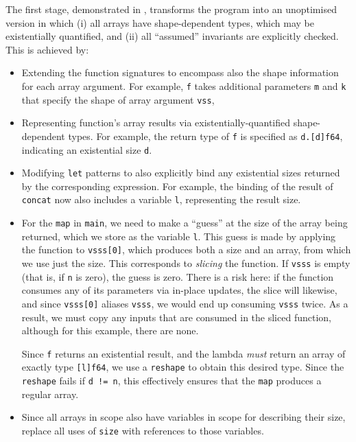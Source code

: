 The first stage, demonstrated in , transforms
the program into an unoptimised version in which (i) all arrays have
shape-dependent types, which may be existentially quantified, and (ii)
all ``assumed'' invariants are explicitly checked.
%
This is achieved by:
\begin{itemize}
\item Extending the function signatures to encompass also the shape
  information for each array argument.  For example, \lstinline{f}
  takes additional parameters \lstinline{m} and \lstinline{k} that
  specify the shape of array argument \lstinline{vss},

\item Representing function's array results via
  existentially-quantified shape-dependent types.  For example, the
  return type of \lstinline{f} is specified as
  \lstinline{d.[d]f64}, indicating an existential size \lstinline{d}.

\item Modifying \lstinline{let} patterns to also explicitly bind any
  existential sizes returned by the corresponding expression.  For
  example, the binding of the result of \lstinline{concat} now also
  includes a variable \lstinline{l}, representing the result size.

\item For the \lstinline{map} in \lstinline{main}, we need to make a
  ``guess'' at the size of the array being returned, which we store as
  the variable \lstinline{l}.  This guess is made by applying the
   function to \lstinline{vsss[0]}, which produces both a size
  and an array, from which we use just the size.  This corresponds to
  \textit{slicing} the  function.  If \lstinline{vsss} is
  empty (that is, if \lstinline{n} is zero), the guess is zero.  There
  is a risk here: if the  function consumes any of its
  parameters via in-place updates, the slice will likewise, and since
  \lstinline{vsss[0]} aliases \lstinline{vsss}, we would end up
  consuming \lstinline{vsss} twice.  As a result, we must copy any
  inputs that are consumed in the sliced function, although for this
  example, there are none.

  Since \lstinline{f} returns an existential result, and the lambda
  \textit{must} return an array of exactly type \lstinline{[l]f64}, we
  use a \lstinline{reshape} to obtain this desired type.  Since the
  \lstinline{reshape} fails if \lstinline{d != n}, this effectively
  ensures that the \lstinline{map} produces a regular array.

\item Since all arrays in scope also have variables in scope for
  describing their size, replace all uses of \lstinline{size} with
  references to those variables.
\end{itemize}

